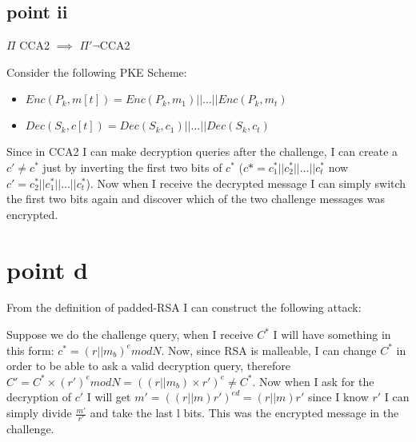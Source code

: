 \newpage
\subsection{point ii}

$\Pi$ CCA2 $\implies$ $\Pi' \neg$CCA2

Consider the following PKE Scheme:
\begin{itemize}
    \item $Enc(P_k,m[t])=Enc(P_k,m_1)||...||Enc(P_k,m_t)$
    \item $Dec(S_k,c[t])=Dec(S_k,c_1)||...||Dec(S_k,c_t)$
\end{itemize}
Since in CCA2 I can make decryption queries after the challenge, I can create a $c'\neq c^*$ just by inverting the first two bits of $c^*$ ($c*=c_1^*||c_2^*||...||c^*_t$ now $c'=c_2^*||c_1^*||...||c^*_t$). Now when I receive the decrypted message I can simply switch the first two bits again and discover which of the two challenge messages was encrypted.

\section{point d}

From the definition of padded-RSA I can construct the following attack:

Suppose we do the challenge query, when I receive $C^*$ I will have something in this form: $c^*=(r||m_b)^e mod N$. Now, since RSA is malleable, I can change $C^*$ in order to be able to ask a valid decryption query, therefore $C'=C^*\times(r')^e mod N= ((r||m_b) \times r')^e\neq C^*$. Now when I ask for the decryption of $c'$ I will get $m'=((r||m)r')^{ed}=(r||m)r'$ since I know $r'$ I can simply divide $\frac{m'}{r'}$ and take the last l bits. This was the encrypted message in the challenge. 